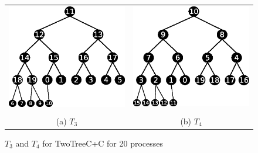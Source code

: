 \documentclass[sigplan,review,anonymous]{acmart}\settopmatter{printfolios=true,printccs=false,printacmref=false}
\begin{document}
\begin{figure}[b]
\begin{tabular}{cc}
\includegraphics[scale=0.46]{images/reordered-twoTreeC-T1.eps} &  \includegraphics[scale=0.46]{images/reordered-twoTreeC-T2.eps} \\ \\
(a) $T_3$ & (b) $T_4$ \\
\end{tabular}
\caption{$T_3$ and $T_4$ for TwoTreeC+C for 20 processes}
\label{fig:reordered}
\end{figure}
\end{document}
